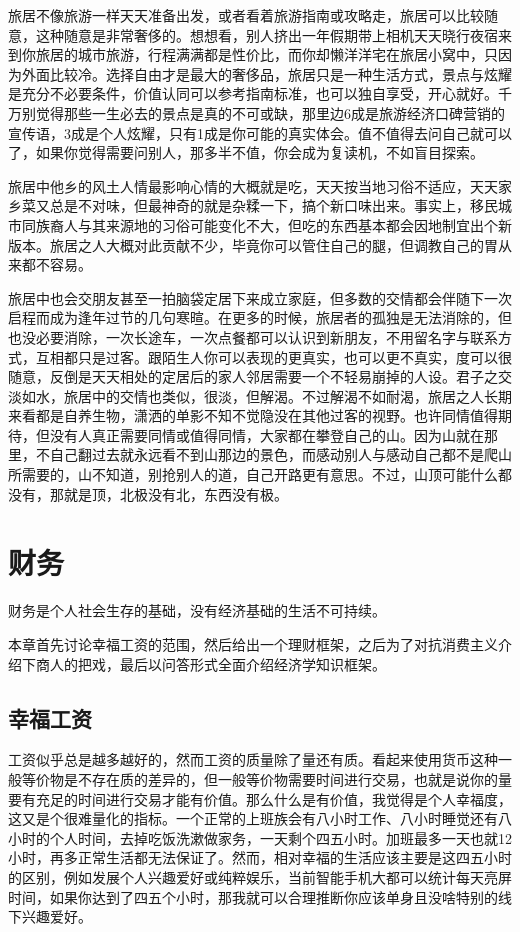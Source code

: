 \documentclass[
  letterpaper,
  DIV=11,
  numbers=noendperiod]{scrreprt}
\begin{document}
旅居不像旅游一样天天准备出发，或者看着旅游指南或攻略走，旅居可以比较随意，这种随意是非常奢侈的。想想看，别人挤出一年假期带上相机天天晓行夜宿来到你旅居的城市旅游，行程满满都是性价比，而你却懒洋洋宅在旅居小窝中，只因为外面比较冷。选择自由才是最大的奢侈品，旅居只是一种生活方式，景点与炫耀是充分不必要条件，价值认同可以参考指南标准，也可以独自享受，开心就好。千万别觉得那些一生必去的景点是真的不可或缺，那里边6成是旅游经济口碑营销的宣传语，3成是个人炫耀，只有1成是你可能的真实体会。值不值得去问自己就可以了，如果你觉得需要问别人，那多半不值，你会成为复读机，不如盲目探索。

旅居中他乡的风土人情最影响心情的大概就是吃，天天按当地习俗不适应，天天家乡菜又总是不对味，但最神奇的就是杂糅一下，搞个新口味出来。事实上，移民城市同族裔人与其来源地的习俗可能变化不大，但吃的东西基本都会因地制宜出个新版本。旅居之人大概对此贡献不少，毕竟你可以管住自己的腿，但调教自己的胃从来都不容易。

旅居中也会交朋友甚至一拍脑袋定居下来成立家庭，但多数的交情都会伴随下一次启程而成为逢年过节的几句寒暄。在更多的时候，旅居者的孤独是无法消除的，但也没必要消除，一次长途车，一次点餐都可以认识到新朋友，不用留名字与联系方式，互相都只是过客。跟陌生人你可以表现的更真实，也可以更不真实，度可以很随意，反倒是天天相处的定居后的家人邻居需要一个不轻易崩掉的人设。君子之交淡如水，旅居中的交情也类似，很淡，但解渴。不过解渴不如耐渴，旅居之人长期来看都是自养生物，潇洒的单影不知不觉隐没在其他过客的视野。也许同情值得期待，但没有人真正需要同情或值得同情，大家都在攀登自己的山。因为山就在那里，不自己翻过去就永远看不到山那边的景色，而感动别人与感动自己都不是爬山所需要的，山不知道，别抢别人的道，自己开路更有意思。不过，山顶可能什么都没有，那就是顶，北极没有北，东西没有极。


\chapter{财务}\label{ux8d22ux52a1}

财务是个人社会生存的基础，没有经济基础的生活不可持续。

本章首先讨论幸福工资的范围，然后给出一个理财框架，之后为了对抗消费主义介绍下商人的把戏，最后以问答形式全面介绍经济学知识框架。

\section{幸福工资}\label{ux5e78ux798fux5de5ux8d44}

工资似乎总是越多越好的，然而工资的质量除了量还有质。看起来使用货币这种一般等价物是不存在质的差异的，但一般等价物需要时间进行交易，也就是说你的量要有充足的时间进行交易才能有价值。那么什么是有价值，我觉得是个人幸福度，这又是个很难量化的指标。一个正常的上班族会有八小时工作、八小时睡觉还有八小时的个人时间，去掉吃饭洗漱做家务，一天剩个四五小时。加班最多一天也就12小时，再多正常生活都无法保证了。然而，相对幸福的生活应该主要是这四五小时的区别，例如发展个人兴趣爱好或纯粹娱乐，当前智能手机大都可以统计每天亮屏时间，如果你达到了四五个小时，那我就可以合理推断你应该单身且没啥特别的线下兴趣爱好。
\end{document}
